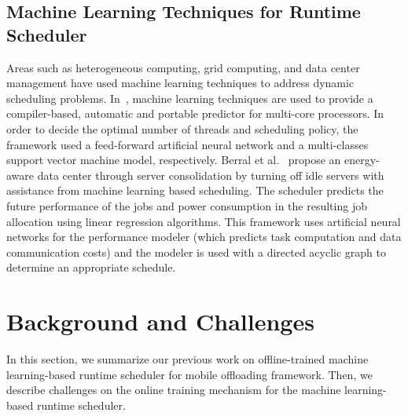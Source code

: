 \documentclass[10pt, conference, compsocconf]{IEEEtran}
\begin{document}
\subsection{Machine Learning Techniques for Runtime Scheduler}
%
Areas such as heterogeneous computing, grid computing, 
and data center management have used machine learning techniques to
address dynamic scheduling problems.
%
In~\cite{zheng}, machine learning techniques are used to provide a
compiler-based, automatic and portable predictor for multi-core
processors.
%
In order to decide the optimal number of threads and scheduling policy,
the framework used a feed-forward artificial neural network and a
multi-classes support vector machine model, respectively.
%
Berral et al.~\cite{josep} propose an energy-aware
data center through server consolidation by turning off idle servers
with assistance from machine learning based scheduling.
%
The scheduler predicts the future performance of the jobs and power
consumption in the resulting job allocation using linear regression
algorithms.
%
This framework uses artificial neural networks for the performance
modeler (which predicts task computation and data communication costs)
and the modeler is used with a directed acyclic graph to determine an
appropriate schedule.\\
%
%
\section{Background and Challenges}
%
In this section, we summarize our previous work on offline-trained machine
learning-based runtime scheduler for mobile offloading framework.
%
Then, we describe challenges on the online training mechanism for the
machine learning-based runtime scheduler.
% 
\end{document}
